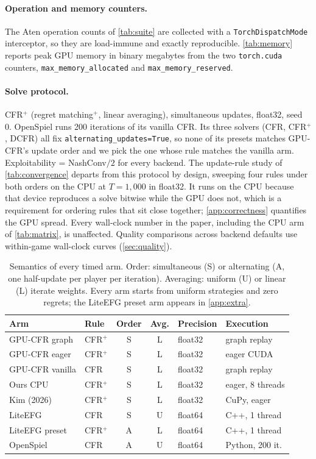 \paragraph{Operation and memory counters.}
The Aten operation counts of \cref{tab:suite} are collected with a
\texttt{TorchDispatchMode} interceptor, so they are load-immune and exactly
reproducible. \cref{tab:memory} reports peak GPU memory in binary megabytes from
the two \texttt{torch.cuda} counters, \texttt{max\_memory\_allocated} and
\texttt{max\_memory\_reserved}.

\paragraph{Solve protocol.}
CFR$^{+}$ (regret matching$^{+}$, linear averaging), simultaneous updates, float32,
seed 0. OpenSpiel runs 200 iterations of its vanilla CFR. Its three solvers
(CFR, CFR$^{+}$, DCFR) all fix \texttt{alternating\_updates=True}, so none of its
presets matches GPU-CFR's update order and we pick the one whose rule matches the
vanilla arm. Exploitability =
NashConv$/2$ for every backend. The update-rule study of \cref{tab:convergence} departs
from this protocol by design, sweeping four rules under both orders on the CPU at
$T{=}1{,}000$ in float32. It runs on the CPU because that device reproduces a solve
bitwise while the GPU does not, which is a requirement for ordering rules that sit close
together; \cref{app:correctness} quantifies the GPU spread. Every wall-clock number in
the paper, including the CPU arm of \cref{tab:matrix}, is unaffected. Quality comparisons across backend defaults use within-game wall-clock curves
(\cref{sec:quality}).

\begin{table}[!htb]
\centering
\caption{Semantics of every timed arm. Order: simultaneous (S) or alternating (A,
one half-update per player per iteration). Averaging: uniform (U) or linear (L)
iterate weights. Every arm starts from uniform strategies and zero regrets; the
LiteEFG preset arm appears in \cref{app:extra}.}
\label{tab:semantics}
{
\setlength{\tabcolsep}{3pt}
\begin{tabular}{llccll}
\toprule
Arm & Rule & Order & Avg. & Precision & Execution \\
\midrule
GPU-CFR graph & CFR$^{+}$ & S & L & float32 & graph replay \\
GPU-CFR eager & CFR$^{+}$ & S & L & float32 & eager CUDA \\
GPU-CFR vanilla & CFR & S & L & float32 & graph replay \\
Ours CPU & CFR$^{+}$ & S & L & float32 & eager, 8 threads \\
Kim (2026) & CFR$^{+}$ & S & L & float32 & CuPy, eager \\
LiteEFG & CFR & S & U & float64 & C++, 1 thread \\
LiteEFG preset & CFR$^{+}$ & A & L & float64 & C++, 1 thread \\
OpenSpiel & CFR & A & U & float64 & Python, 200 it. \\
\bottomrule
\end{tabular}}
\end{table}

